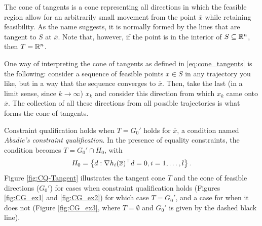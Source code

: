 The cone of tangents is a cone representing all directions in which the feasible region allow for an arbitrarily small movement from the point $\overline{x}$ while retaining feasibility. As the name suggests, it is normally formed by the lines that are tangent to $S$ at $\overline{x}$. Note that, however, if the point is in the interior of $S \subseteq \mathbb{R}^n$, then $T = \mathbb{R}^n$. 

One way of interpreting the cone of tangents as defined in  \eqref{eq:cone_tangents} is the following: consider a sequence of feasible points $x \in S$ in any trajectory you like, but in a way that the sequence converges to $\overline{x}$. Then, take the last (in a limit sense, since $k \rightarrow \infty$) $x_k$ and consider this direction from which $x_k$ came onto $\overline{x}$. The collection of all these directions from all possible trajectories is what forms the cone of tangents.  

Constraint qualification holds when $T = G_0'$ holds for $\overline{x}$, a condition named \emph{Abadie's constraint qualification}. In the presence of equality constraints, the condition becomes $T = G_0' \cap H_0$, with 
%
\begin{align*}
	H_0 = \left\{ d: \nabla h_i(\overline{x})^\top d = 0, i =1, \dots, l \right \}.
\end{align*} 
%
Figure \ref{fig:CQ-Tangent} illustrates the tangent cone $T$ and the cone of feasible directions ($G_0'$) for cases when constraint qualification holds (Figures \ref{fig:CG_ex1} and \ref{fig:CG_ex2}) for which case $T = G_0'$, and a case for when it does not (Figure \ref{fig:CG_ex3}, where $T = \emptyset$ and $G_0'$ is given by the dashed black line). 
%

